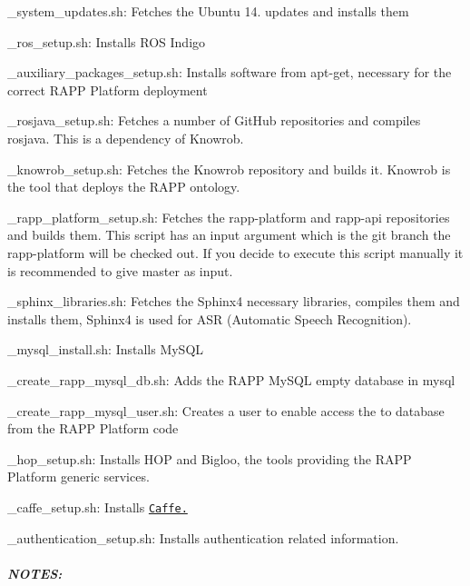 \begin{DoxyItemize}
\item {\-\_\-system\-\_\-updates.\-sh}\-: Fetches the Ubuntu 14. updates and installs them
\item {\-\_\-ros\-\_\-setup.\-sh}\-: Installs R\-O\-S Indigo
\item {\-\_\-auxiliary\-\_\-packages\-\_\-setup.\-sh}\-: Installs software from apt-\/get, necessary for the correct R\-A\-P\-P Platform deployment
\item {\-\_\-rosjava\-\_\-setup.\-sh}\-: Fetches a number of Git\-Hub repositories and compiles rosjava. This is a dependency of Knowrob.
\item {\-\_\-knowrob\-\_\-setup.\-sh}\-: Fetches the Knowrob repository and builds it. Knowrob is the tool that deploys the R\-A\-P\-P ontology.
\item {\-\_\-rapp\-\_\-platform\-\_\-setup.\-sh}\-: Fetches the rapp-\/platform and rapp-\/api repositories and builds them. This script has an input argument which is the git branch the rapp-\/platform will be checked out. If you decide to execute this script manually it is recommended to give {\ttfamily master} as input.
\item {\-\_\-sphinx\-\_\-libraries.\-sh}\-: Fetches the Sphinx4 necessary libraries, compiles them and installs them, Sphinx4 is used for A\-S\-R (Automatic Speech Recognition).
\item {\-\_\-mysql\-\_\-install.\-sh}\-: Installs My\-S\-Q\-L
\item {\-\_\-create\-\_\-rapp\-\_\-mysql\-\_\-db.\-sh}\-: Adds the R\-A\-P\-P My\-S\-Q\-L empty database in mysql
\item {\-\_\-create\-\_\-rapp\-\_\-mysql\-\_\-user.\-sh}\-: Creates a user to enable access the to database from the R\-A\-P\-P Platform code
\item {\-\_\-hop\-\_\-setup.\-sh}\-: Installs H\-O\-P and Bigloo, the tools providing the R\-A\-P\-P Platform generic services.
\item {\-\_\-caffe\-\_\-setup.\-sh}\-: Installs \href{https://github.com/BVLC/caffe.git}{\tt Caffe.}
\item {\-\_\-authentication\-\_\-setup.\-sh}\-: Installs authentication related information.
\end{DoxyItemize}

\subparagraph*{N\-O\-T\-E\-S\-:}

